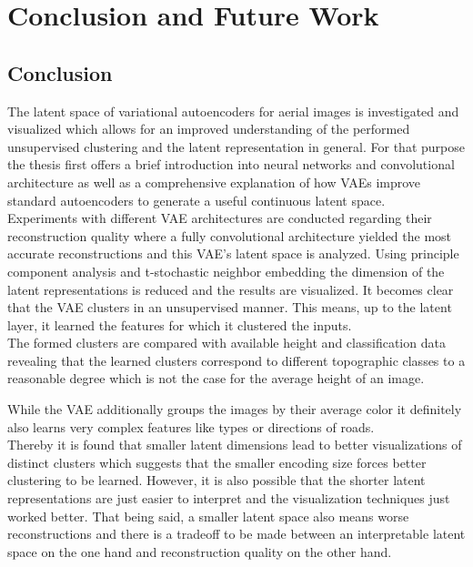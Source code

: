 \section{Conclusion and Future Work}
\subsection{Conclusion}

The latent space of variational autoencoders for aerial images is investigated and visualized 
which allows for an improved understanding of the performed unsupervised clustering and the 
latent representation in general. For that purpose the thesis first offers a brief introduction
into neural networks and convolutional architecture as well as a comprehensive explanation 
of how VAEs improve standard autoencoders to generate a useful continuous latent space.\\ 

Experiments with different VAE architectures are conducted regarding their reconstruction quality where a fully
convolutional architecture yielded the most accurate reconstructions and this VAE's latent space is analyzed.
Using principle component analysis and t-stochastic neighbor embedding the dimension of the latent representations
is reduced and the results are visualized. It becomes clear that the VAE clusters in an unsupervised manner.
This means, up to the latent layer, it learned the features for which it clustered the inputs.\\

The formed clusters are compared with available height and classification data revealing that the learned clusters
correspond to different topographic classes to a reasonable degree which is not the case for the average height of
an image. 

While the VAE additionally groups the images by their average color it definitely also learns very complex features 
like types or directions of roads.\\

Thereby it is found that smaller latent dimensions lead to better visualizations of distinct clusters which suggests
that the smaller encoding size forces better clustering to be learned. However, it is also possible that the 
shorter latent representations are just easier to interpret and the visualization techniques just worked better.
That being said, a smaller latent space also means worse reconstructions and there is a tradeoff to be made between
an interpretable latent space on the one hand and reconstruction quality on the other hand.



